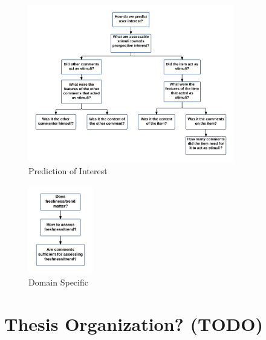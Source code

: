 \begin{figure}[!h]
\centering
\includegraphics[width=0.8\textwidth]{c-intro_images/r_questions_2.png}
\caption{Prediction of Interest}
\label{fig:r_questions_pred}
\end{figure}

\begin{figure}[!h]
\centering
\includegraphics[width=0.25\textwidth]{c-intro_images/r_questions_3.png}
\caption{Domain Specific}
\label{fig:r_questions_misc}
\end{figure}

\section{Thesis Organization? (TODO)}